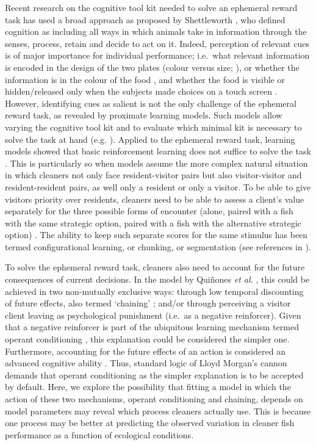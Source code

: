 \documentclass[]{rsos}%
\begin{document}
Recent research on the cognitive tool kit needed to solve an ephemeral
reward task has used a broad approach as proposed by Shettleworth
\citep{shettleworth_Cognition_2009},
who defined cognition as including all ways in which animals take in information
through the senses, process, retain and decide to act on it. Indeed, perception
of relevant cues is of major importance for individual performance;
i.e.~what relevant information is encoded in the design of the two
plates (colour versus size; \citep{wismer_Cuebased_2019}), or whether
the information is in the colour of
the food \citep{pretot_Comparative_2021, pretot_Comparing_2016}, and
whether the food is visible or hidden/released only when the subjects
made choices on a touch screen \citep{pretot_Factors_2016}. However, identifying
cues as salient is not the only challenge of the ephemeral reward task,
as revealed by proximate learning models. Such models allow varying the
cognitive tool kit and to evaluate which minimal kit is necessary to solve
the task at hand (e.g. \citep{dubois_Model_2021}). Applied to the ephemeral
reward task, learning models showed that basic reinforcement learning does
not suffice to solve the task \citep{prat_Modelling_2022, quinones_Reinforcement_2019}.
This is particularly so when models assume the more complex natural
situation in which cleaners not only face resident-visitor pairs but also
visitor-visitor and resident-resident pairs, as well only a resident or
only a visitor. To be able to give visitors priority over residents,
cleaners need to be able to assess a client's value separately for the
three possible forms of encounter (alone, paired with a fish with the
same strategic option, paired with a fish with the alternative strategic option)
\citep{quinones_Reinforcement_2019}. The ability to keep such separate scores
for the same stimulus has been termed configurational learning,
or chunking, or segmentation (see references in \citep{prat_Modelling_2022}).

To solve the ephemeral reward task, cleaners also need to account for
the future consequences of current decisions. In the model by
Quiñones \emph{et al.} \citep{quinones_Reinforcement_2019}, this could be achieved in
two non-mutually exclusive ways: through low temporal discounting of
future effects, also termed `chaining' \citep{enquist_Power_2016}; and/or
through perceiving a visitor client leaving as psychological punishment
(i.e.~as a negative reinforcer). Given that a negative reinforcer is part
of the ubiquitous learning mechanism termed operant conditioning
\citep{thorndike_Animal_1898, skinner_Behavior_1938}, this explanation
could be considered the simpler one. Furthermore, accounting for the
future effects of an action is considered an advanced cognitive
ability \citep{suddendorf_Evolution_2007}. Thus, standard logic of
Lloyd Morgan's cannon demands that operant conditioning as the simpler
explanation is to be accepted by default. Here, we explore the
possibility that fitting a model in which the action of these two
mechanisms, operant conditioning and chaining, depends
on model parameters may reveal which process cleaners actually use.
This is because one process may be better at predicting the observed
variation in cleaner fish performance as a function of ecological conditions.
\end{document}
